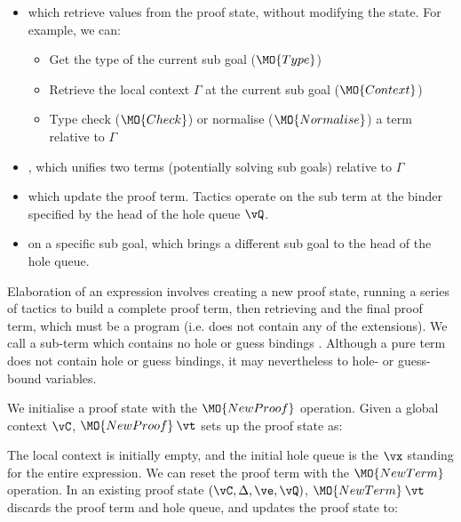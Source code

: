 \begin{itemize}
\item {} which retrieve values from the proof state, without modifying
the state. For example, we can:
\begin{itemize}
\item Get the type of the current sub goal ($\MO{Type}$)
\item Retrieve the local context $\Gamma$ at the current sub goal ($\MO{Context}$)
\item Type check ($\MO{Check}$) or normalise ($\MO{Normalise}$) a term relative to $\Gamma$
\end{itemize}
\item {}, which unifies two terms (potentially solving sub goals) 
relative to $\Gamma$
\item {} which update the proof term. Tactics operate on the sub term
at the binder specified by the head of the hole queue $\vQ$.
\item {} on a specific sub goal, which brings a different sub goal to the
head of the hole queue.
\end{itemize}

Elaboration of an \Idris{} expression involves creating a new proof state, running
a series of tactics to build a complete proof term, then retrieving and 
the final proof term, which must be a \TT{} program (i.e. does not contain any of the
\TTdev{} extensions). We call a sub-term which contains no hole or guess bindings 
. Although a pure term does not contain hole or guess bindings, it may
nevertheless  to hole- or guess-bound variables.

We initialise a proof state with the $\MO{NewProof}$ operation. Given a global
context $\vC$, $\MO{NewProof}\:\vt$ sets up the proof state as:

\DM{
(\vC, \cdot, \hole{\vx}{\vt}\SC\vx, \langle\vx\rangle)
}

The local context is initially empty, and the initial hole queue is the $\vx$ standing for
the entire expression. We can reset the proof term with the $\MO{NewTerm}$ operation.
In an existing proof state $(\vC, \Delta, \ve, \vQ)$,
$\MO{NewTerm}\:\vt$ discards the proof term and hole queue, and
updates the proof state to:

\DM{
(\vC, \Delta, \hole{\vx}{\vt}\SC\vx, \langle\vx\rangle)
}


